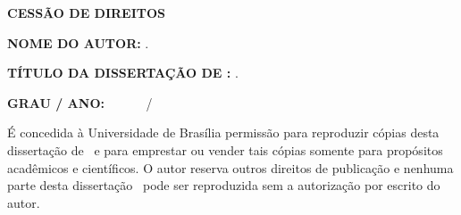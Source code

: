 \begin{fichacatalografica}
		\vspace{6mm}
		
		\noindent  \MakeUppercase{\textbf{Cess\~{a}o de Direitos}} 
		
		\vspace{5mm}
		
		\noindent \textbf{NOME DO AUTOR:} \imprimirautor.
		\vspace{6mm}
		
		\noindent \textbf{T\'{I}TULO DA DISSERTA\c{C}\~{A}O DE \MakeUppercase{\imprimirtipo}:} \imprimirtitulo.
		
		\vspace{3mm}
		\noindent \textbf{GRAU / ANO:}~ ~ ~ \MakeUppercase\imprimirgrau~ / \imprimirano
		
		\vspace{5mm}
		
		\noindent \'{E} concedida \`{a} Universidade de Bras\'{i}lia permiss\~{a}o para reproduzir c\'{o}pias desta disserta\c{c}\~{a}o de \imprimirtipo~e para emprestar ou vender tais c\'{o}pias somente para prop\'{o}sitos acad\^{e}micos e cient\'{i}ficos. O autor reserva outros direitos de publica\c{c}\~{a}o e nenhuma parte desta disserta\c{c}\~{a}o \imprimirtipo~pode ser reproduzida sem a autoriza\c{c}\~{a}o por escrito do autor.
		
		\vspace{10mm}
		
		\noindent \underline{\hspace{65mm}}
		
		\vspace{-2mm}
		
		\noindent  \imprimirautor
		\vspace{-2mm}
		
		\noindent 
		\vspace{-2mm}
		
		\vspace{-2mm}
\end{fichacatalografica}

\newpage